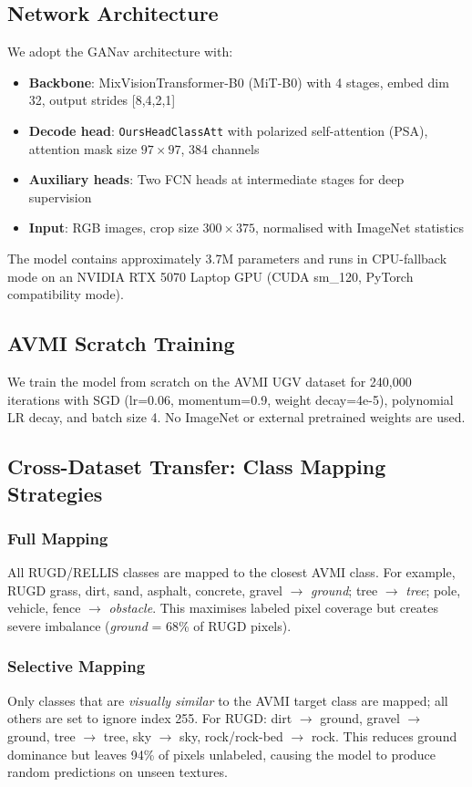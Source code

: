 \documentclass[conference]{IEEEtran}
\begin{document}
\subsection{Network Architecture}
We adopt the GANav architecture with:
\begin{itemize}
    \item \textbf{Backbone}: MixVisionTransformer-B0 (MiT-B0) with 4 stages, embed dim 32, output strides [8,4,2,1]
    \item \textbf{Decode head}: \texttt{OursHeadClassAtt} with polarized self-attention (PSA), attention mask size $97\times97$, 384 channels
    \item \textbf{Auxiliary heads}: Two FCN heads at intermediate stages for deep supervision
    \item \textbf{Input}: RGB images, crop size $300\times375$, normalised with ImageNet statistics
\end{itemize}
The model contains approximately 3.7M parameters and runs in CPU-fallback mode on an NVIDIA RTX 5070 Laptop GPU (CUDA sm\_120, PyTorch compatibility mode).

\subsection{AVMI Scratch Training}
We train the model from scratch on the AVMI UGV dataset for 240,000 iterations with SGD (lr=0.06, momentum=0.9, weight decay=4e-5), polynomial LR decay, and batch size 4. No ImageNet or external pretrained weights are used.

\subsection{Cross-Dataset Transfer: Class Mapping Strategies}

\subsubsection{Full Mapping}
All RUGD/RELLIS classes are mapped to the closest AVMI class. For example, RUGD grass, dirt, sand, asphalt, concrete, gravel $\rightarrow$ \textit{ground}; tree $\rightarrow$ \textit{tree}; pole, vehicle, fence $\rightarrow$ \textit{obstacle}. This maximises labeled pixel coverage but creates severe imbalance (\textit{ground} = 68\% of RUGD pixels).

\subsubsection{Selective Mapping}
Only classes that are \emph{visually similar} to the AVMI target class are mapped; all others are set to ignore index 255. For RUGD: dirt $\rightarrow$ ground, gravel $\rightarrow$ ground, tree $\rightarrow$ tree, sky $\rightarrow$ sky, rock/rock-bed $\rightarrow$ rock. This reduces ground dominance but leaves 94\% of pixels unlabeled, causing the model to produce random predictions on unseen textures.
\end{document}
